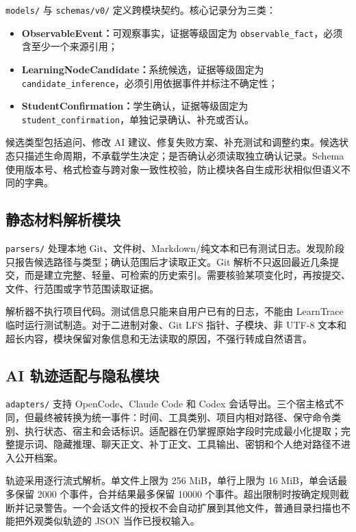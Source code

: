 \documentclass[UTF8,a4paper,12pt]{ctexart}
\begin{document}
\texttt{models/} 与 \texttt{schemas/v0/} 定义跨模块契约。核心记录分为三类：

\begin{itemize}
  \item \textbf{ObservableEvent：}可观察事实，证据等级固定为 \texttt{observable\_fact}，必须含至少一个来源引用；
  \item \textbf{LearningNodeCandidate：}系统候选，证据等级固定为 \texttt{candidate\_inference}，必须引用依据事件并标注不确定性；
  \item \textbf{StudentConfirmation：}学生确认，证据等级固定为 \texttt{student\_confirmation}，单独记录确认、补充或否认。
\end{itemize}

候选类型包括追问、修改 AI 建议、修复失败方案、补充测试和调整约束。候选状态只描述生命周期，不承载学生决定；是否确认必须读取独立确认记录。Schema 使用版本号、格式检查与跨对象一致性校验，防止模块各自生成形状相似但语义不同的字典。

\subsection{静态材料解析模块}

\texttt{parsers/} 处理本地 Git、文件树、Markdown/纯文本和已有测试日志。发现阶段只报告候选路径与类型；确认范围后才读取正文。Git 解析不只返回最近几条提交，而是建立完整、轻量、可检索的历史索引。需要核验某项变化时，再按提交、文件、行范围或字节范围读取证据。

解析器不执行项目代码。测试信息只能来自用户已有的日志，不能由 LearnTrace 临时运行测试制造。对于二进制对象、Git LFS 指针、子模块、非 UTF-8 文本和超长内容，模块保留对象信息和无法读取的原因，不强行转成自然语言。

\subsection{AI 轨迹适配与隐私模块}

\texttt{adapters/} 支持 OpenCode、Claude Code 和 Codex 会话导出。三个宿主格式不同，但最终被转换为统一事件：时间、工具类别、项目内相对路径、保守命令类别、执行状态、宿主和会话标识。适配器在仍掌握原始字段时完成最小化提取；完整提示词、隐藏推理、聊天正文、补丁正文、工具输出、密钥和个人绝对路径不进入公开档案。

轨迹采用逐行流式解析。单文件上限为 256 MiB，单行上限为 16 MiB，单会话最多保留 2000 个事件，合并结果最多保留 10000 个事件。超出限制时按确定规则截断并记录警告。一个会话文件的授权不会自动扩展到其他文件，普通目录扫描也不能把外观类似轨迹的 JSON 当作已授权输入。
\end{document}
